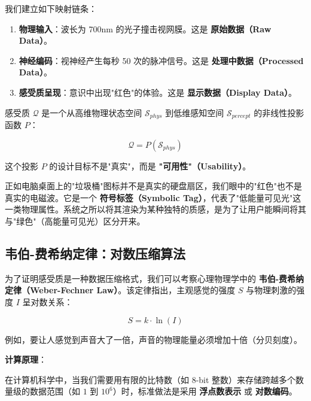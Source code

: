 我们建立如下映射链条：

\begin{enumerate}
\item \textbf{物理输入}：波长为 700nm 的光子撞击视网膜。这是 \textbf{原始数据（Raw Data）}。

\item \textbf{神经编码}：视神经产生每秒 50 次的脉冲信号。这是 \textbf{处理中数据（Processed Data）}。

\item \textbf{感受质呈现}：意识中出现"红色"的体验。这是 \textbf{显示数据（Display Data）}。
\end{enumerate}

\begin{definition}[感受质映射]
感受质 $\mathcal{Q}$ 是一个从高维物理状态空间 $\mathcal{S}_{phys}$ 到低维感知空间 $\mathcal{S}_{percept}$ 的非线性投影函数 $P$：

\begin{equation}
\mathcal{Q} = P(\mathcal{S}_{phys})
\end{equation}

这个投影 $P$ 的设计目标不是"真实"，而是 \textbf{"可用性"（Usability）}。
\end{definition}

正如电脑桌面上的"垃圾桶"图标并不是真实的硬盘扇区，我们眼中的"红色"也不是真实的电磁波。它是一个 \textbf{符号标签（Symbolic Tag）}，代表了"低能量可见光"这一类物理属性。系统之所以将其渲染为某种独特的质感，是为了让用户能瞬间将其与"绿色"（高能量可见光）区分开来。

\subsection{韦伯-费希纳定律：对数压缩算法}

为了证明感受质是一种数据压缩格式，我们可以考察心理物理学中的 \textbf{韦伯-费希纳定律（Weber-Fechner Law）}。该定律指出，主观感觉的强度 $S$ 与物理刺激的强度 $I$ 呈对数关系：

\begin{equation}
S = k \cdot \ln(I)
\end{equation}

例如，要让人感觉到声音大了一倍，声音的物理能量必须增加十倍（分贝刻度）。

\textbf{计算原理}：

在计算机科学中，当我们需要用有限的比特数（如 8-bit 整数）来存储跨越多个数量级的数据范围（如 $1$ 到 $10^6$）时，标准做法是采用 \textbf{浮点数表示} 或 \textbf{对数编码}。

